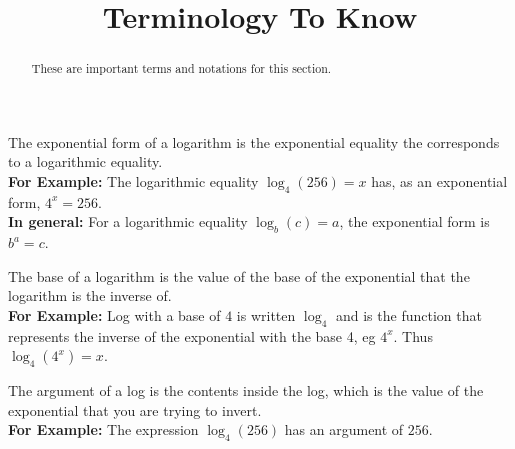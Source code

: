 \documentclass{ximera}
\title{Terminology To Know}
\begin{document}
\begin{abstract}
    These are important terms and notations for this section.
\end{abstract}
\maketitle


\begin{definition}
    The exponential form of a logarithm is the exponential equality the corresponds to a logarithmic equality.\\
    \textbf{For Example:} The logarithmic equality $\log_4(256) = x$ has, as an exponential form, $4^x = 256$.\\
    \textbf{In general:} For a logarithmic equality $\log_b(c) = a$, the exponential form is $b^a = c$.
\end{definition} 

\begin{definition}
    The base of a logarithm is the value of the base of the exponential that the logarithm is the inverse of.\\
    \textbf{For Example:} Log with a base of $4$ is written $\log_4$ and is the function that represents the inverse of the exponential with the base 4, eg $4^x$. Thus $\log_4(4^x) = x$.
\end{definition} 

\begin{definition}
    The argument of a log is the contents inside the log, which is the value of the exponential that you are trying to invert.\\
    \textbf{For Example:} The expression $\log_4(256)$ has an argument of $256$.
\end{definition}
\end{document}
